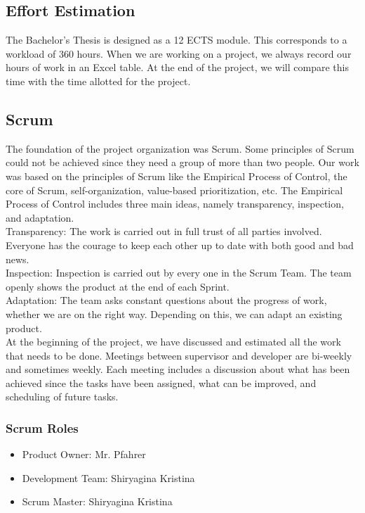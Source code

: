 \documentclass{scrartcl}
\begin{document}
\subsection{Effort Estimation}
  		
The Bachelor's Thesis  is designed as a 12 ECTS module. This corresponds to a workload of 360 hours. When we are working on a project, we always record our hours of work in an Excel table.
 At the end of the project, we will compare this time with the time allotted for the project. 		
  		
  		
  		
  		
  		
\subsection{Scrum}  	
The foundation of the project organization was Scrum.
 	    Some principles of Scrum could not be achieved since they need a group of more than two people. 
 	    Our work was based on the principles of Scrum like the Empirical Process of Control, the core of Scrum, self-organization, value-based prioritization, etc.
 	    The Empirical Process of Control includes three main ideas, namely transparency, inspection, and adaptation. \\
 	    Transparency: The work is carried out in full trust of all parties involved. Everyone has the courage to keep each other up to date with both good and bad news. \\ 
 	    Inspection: Inspection is carried out by every one in the Scrum Team. The team openly shows the product at the end of each Sprint.			 \\
 	    Adaptation: The team asks constant questions about the progress of work, whether we are on the right way. Depending on this, we can adapt an existing product.		 \\
 	    
 	    At the beginning of the project, we have discussed and estimated all the work that needs to be done. 
 	    Meetings between supervisor and developer are bi-weekly and sometimes weekly.
 	    Each meeting includes a discussion about what has been achieved 
 	    since the tasks have been assigned, what can be improved, and scheduling of future tasks.
 	    
 	    
 	    
 	    
 	    
 \subsubsection{Scrum Roles}
 \begin{itemize}
 \item Product Owner: Mr. Pfahrer
 \item Development Team: Shiryagina Kristina
 \item Scrum Master: Shiryagina Kristina
  		
  		\end{itemize}
\end{document}
